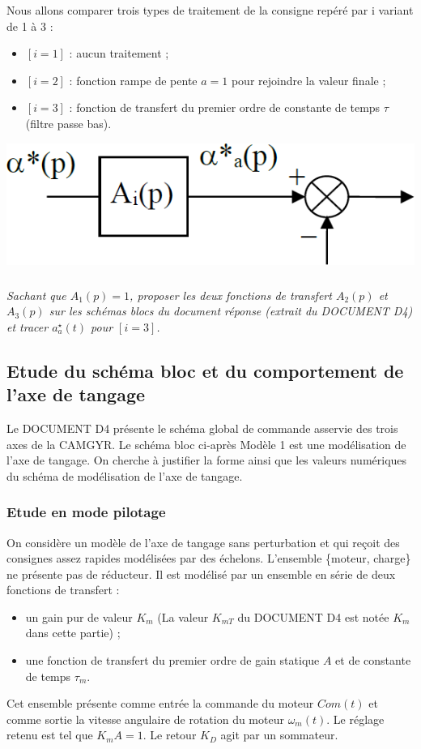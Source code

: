 \documentclass[10pt,fleqn]{article} %
\begin{document}
Nous allons comparer trois types de traitement de la consigne repéré par i variant de 1 à 3 :
\begin{itemize}
\item $[i=1]$ : aucun traitement ;
\item $[i=2]$ : fonction rampe de pente $a = 1$ pour rejoindre la valeur finale ;
\item $[i=3]$ : fonction de transfert du premier ordre de constante de temps $\tau$ (filtre passe bas).
\end{itemize}

\begin{center}
\includegraphics[width=.25\linewidth]{fig_b}
\end{center}

\subparagraph{\label{q21}}\textit{Sachant que  $A_1(p) = 1$, proposer les deux fonctions de transfert $A_2(p)$ et $A_3(p)$ sur les schémas blocs du document réponse (extrait du DOCUMENT D4) et tracer $a^{\star}_a(t)$ pour $[i=3]$.} 

\subsection{Etude du schéma bloc et du comportement de l’axe de tangage}

Le DOCUMENT D4 présente le schéma global de commande asservie des trois axes de la CAMGYR. Le schéma bloc ci-après Modèle 1 est une modélisation de l’axe de tangage.
On cherche à justifier la forme ainsi que les valeurs numériques du schéma de modélisation de l’axe de tangage.

\subsubsection{Etude en mode pilotage}

On considère un modèle de l’axe de tangage sans perturbation et qui reçoit des consignes assez rapides modélisées par des échelons.
L’ensemble \{moteur, charge\} ne présente pas de réducteur. Il est modélisé par un ensemble en série de deux fonctions de transfert :
\begin{itemize}
\item un gain pur de valeur $K_m$ (La valeur $K_{mT}$ du DOCUMENT D4 est notée $K_m$ dans cette partie) ;
\item une fonction de transfert du premier ordre de gain statique $A$ et de constante de temps $\tau_m$.
\end{itemize}
Cet ensemble présente comme entrée la commande du moteur $Com(t)$ et comme sortie la vitesse angulaire de rotation du moteur $\omega_m(t)$. Le réglage retenu est tel que $K_m A = 1$.
Le retour $K_D$ agit par un sommateur.
\end{document}
